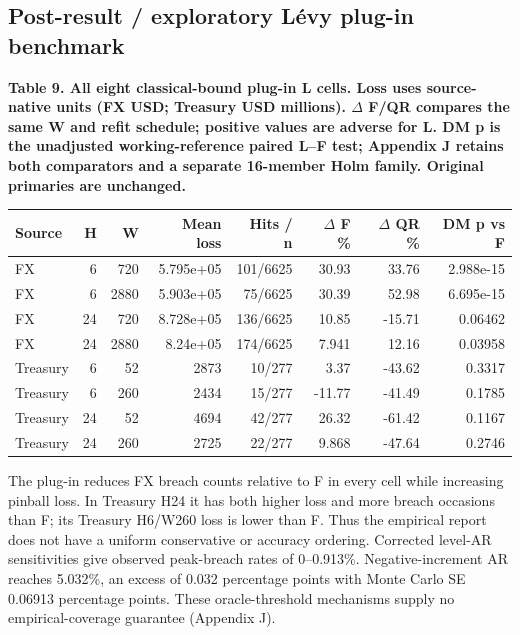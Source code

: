 \documentclass[10pt,a4paper]{article}
\begin{document}
\subsection*{Post-result / exploratory Lévy plug-in benchmark}
\begin{center}
\begin{minipage}{\linewidth}
\small\textbf{Table 9. All eight classical-bound plug-in L cells. Loss uses source-native units (FX USD; Treasury USD millions). \(\Delta\) F/QR compares the same W and refit schedule; positive values are adverse for L. DM p is the unadjusted working-reference paired L--F test; Appendix J retains both comparators and a separate 16-member Holm family. Original primaries are unchanged.}\par\medskip
\centering\fontsize{8}{10}\selectfont
\begin{tabular}{lrrrrrrr}
\toprule
Source & H & W & Mean loss & Hits / n & \(\Delta\) F \% & \(\Delta\) QR \% & DM p vs F \\
\midrule
FX & 6 & 720 & 5.795e+05 & 101/6625 & 30.93 & 33.76 & 2.988e-15 \\
FX & 6 & 2880 & 5.903e+05 & 75/6625 & 30.39 & 52.98 & 6.695e-15 \\
FX & 24 & 720 & 8.728e+05 & 136/6625 & 10.85 & -15.71 & 0.06462 \\
FX & 24 & 2880 & 8.24e+05 & 174/6625 & 7.941 & 12.16 & 0.03958 \\
Treasury & 6 & 52 & 2873 & 10/277 & 3.37 & -43.62 & 0.3317 \\
Treasury & 6 & 260 & 2434 & 15/277 & -11.77 & -41.49 & 0.1785 \\
Treasury & 24 & 52 & 4694 & 42/277 & 26.32 & -61.42 & 0.1167 \\
Treasury & 24 & 260 & 2725 & 22/277 & 9.868 & -47.64 & 0.2746 \\
\bottomrule
\end{tabular}
\end{minipage}
\end{center}
The plug-in reduces FX breach counts relative to F in every cell while increasing pinball loss. In Treasury H24 it has both higher loss and more breach occasions than F; its Treasury H6/W260 loss is lower than F. Thus the empirical report does not have a uniform conservative or accuracy ordering. Corrected level-AR sensitivities give observed peak-breach rates of 0--0.913\%. Negative-increment AR reaches 5.032\%, an excess of 0.032 percentage points with Monte Carlo SE 0.06913 percentage points. These oracle-threshold mechanisms supply no empirical-coverage guarantee (Appendix J).
\end{document}
